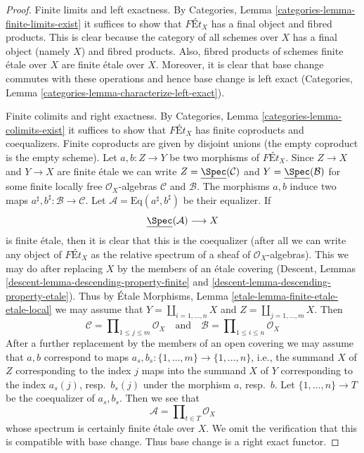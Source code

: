 \begin{proof}
Finite limits and left exactness. By
Categories, Lemma \ref{categories-lemma-finite-limits-exist}
it suffices to show that $\textit{F\'Et}_X$ has a final object
and fibred products. This is clear because the category of
all schemes over $X$ has a final object (namely $X$) and fibred products.
Also, fibred products of schemes finite \'etale over $X$ are
finite \'etale over $X$. Moreover, it is clear that base
change commutes with these operations and hence base change
is left exact (Categories, Lemma
\ref{categories-lemma-characterize-left-exact}).

\medskip\noindent
Finite colimits and right exactness. By
Categories, Lemma \ref{categories-lemma-colimits-exist}
it suffices to show that $\textit{F\'Et}_X$ has finite
coproducts and coequalizers. Finite coproducts are given
by disjoint unions (the empty coproduct is the empty scheme).
Let $a, b : Z \to Y$ be two morphisms of $\textit{F\'Et}_X$.
Since $Z \to X$ and $Y \to X$ are finite \'etale we can write
$Z = \underline{\Spec}(\mathcal{C})$ and $Y = \underline{\Spec}(\mathcal{B})$
for some finite locally free $\mathcal{O}_X$-algebras $\mathcal{C}$
and $\mathcal{B}$. The morphisms $a, b$ induce two maps
$a^\sharp, b^\sharp : \mathcal{B} \to \mathcal{C}$.
Let $\mathcal{A} = \text{Eq}(a^\sharp, b^\sharp)$ be their
equalizer. If
$$
\underline{\Spec}(\mathcal{A}) \longrightarrow X
$$
is finite \'etale, then it is clear that this is the coequalizer
(after all we can write any object of $\textit{F\'Et}_X$
as the relative spectrum of a sheaf of $\mathcal{O}_X$-algebras).
This we may do after replacing $X$ by the members of an \'etale
covering (Descent, Lemmas \ref{descent-lemma-descending-property-finite}
and \ref{descent-lemma-descending-property-etale}).
Thus by \'Etale Morphisms, Lemma \ref{etale-lemma-finite-etale-etale-local}
we may assume that
$Y = \coprod_{i = 1, \ldots, n} X$ and $Z = \coprod_{j = 1, \ldots, m} X$.
Then
$$
\mathcal{C} = \prod\nolimits_{1 \leq j \leq m} \mathcal{O}_X
\quad\text{and}\quad
\mathcal{B} = \prod\nolimits_{1 \leq i \leq n} \mathcal{O}_X
$$
After a further replacement by the members of an open covering
we may assume that $a, b$ correspond to
maps $a_s, b_s : \{1, \ldots, m\} \to \{1, \ldots, n\}$, i.e.,
the summand $X$ of $Z$ corresponding to the index $j$ maps into
the summand $X$ of $Y$ corresponding to the index $a_s(j)$, resp.\ $b_s(j)$
under the morphism $a$, resp.\ $b$.
Let $\{1, \ldots, n\} \to T$ be the coequalizer of $a_s, b_s$.
Then we see that
$$
\mathcal{A} = \prod\nolimits_{t \in T} \mathcal{O}_X
$$
whose spectrum is certainly finite \'etale over $X$. We
omit the verification that this is compatible with base change.
Thus base change is a right exact functor.
\end{proof}

